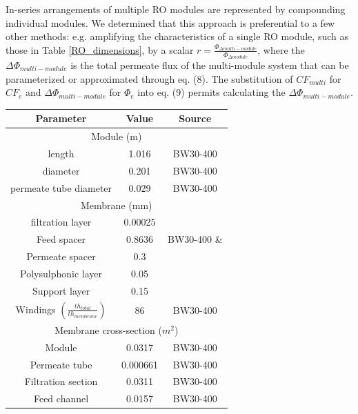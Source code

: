 \begin{supplementary}
In-series arrangements of multiple RO modules are represented by compounding individual modules. We determined that this approach is preferential to a few other methods: e.g. amplifying the characteristics of a single RO module, such as those in Table \ref{RO_dimensions}, by a scalar $r=\frac{\Phi_{\Delta multi-module}}{\Phi_{\Delta module}}$, where the $\Delta \Phi_{multi-module}$ is the total permeate flux of the multi-module system that can be parameterized or approximated through eq. (8). The substitution of $CF_{multi}$ for $CF_e$ and $\Delta \Phi_{multi-module}$ for $\Phi_e$ into eq. (9) permits calculating the $\Delta \Phi_{multi-module}$. 

\begin{savenotes}
\begin{table}[!h]
    \centering
    \begin{tabular}{|c|c|c|}
        \toprule
        \textbf{Parameter} & \textbf{Value} & \textbf{Source} \\ \midrule
        
        \multicolumn{3}{c}{Module (m)} \\ \midrule
        length & 1.016 & BW30-400 \cite{2020FilmTecElement} \\ 
        diameter & 0.201 & BW30-400 \cite{2020FilmTecElement}\\
        permeate tube diameter & 0.029 & BW30-400 \cite{2020FilmTecElement}\\ \midrule
        
        \multicolumn{3}{c}{Membrane (mm)} \\ \midrule
        filtration layer & 0.00025 & \cite{Pacheco2010CharacterizationTechniques,Jeong2007InterfacialMembranes} \\
        Feed spacer & 0.8636 & BW30-400 \cite{2020FilmTecElement} \& \cite{Sablani2002InfluenceSystems} \\
        Permeate spacer & 0.3 & \\
        Polysulphonic layer & 0.05 &  \\
        Support layer & 0.15 &  \\
        Windings $\left( \frac{th_{total}}{th_{membrane}} \right) $ & 86 & BW30-400 \cite{2020FilmTecElement} \\ \midrule
        
        \multicolumn{3}{c}{Membrane cross-section ($m^2$)} \\ \midrule
        Module & 0.0317 & BW30-400 \cite{2020FilmTecElement}\\
        Permeate tube & 0.000661 & BW30-400 \cite{2020FilmTecElement}\\
        Filtration section & 0.0311 & BW30-400 \cite{2020FilmTecElement}\\
        Feed channel & 0.0157 & BW30-400 \cite{2020FilmTecElement}\\ \midrule
        

\end{tabular}
\end{table}
\end{savenotes}
\end{supplementary}
